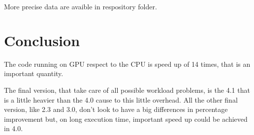 More precise data are avaible in respository folder.

\section{Conclusion}

The code running on GPU respect to the CPU is speed up of 14 times, that is an important quantity.

The final version, that take care of all possible workload problems, is the 4.1 that is a little heavier than 
the 4.0 cause to this little overhead. All the other final version, like 2.3 and 3.0, don't look to have a big 
differences in percentage improvement but, on long execution time, important speed up could be achieved in 4.0.
